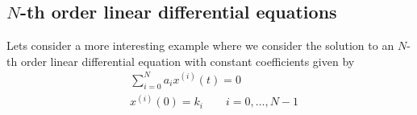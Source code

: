 \documentclass[a4paper,11pt]{exam}
\newcounter{ct}
\begin{document}
\begin{questions}
\subsection{$N$-th order linear differential equations}
Lets consider a more interesting example where we consider the solution to an $N$-th order linear differential equation with constant coefficients given by
\begin{align}
    &\sum_{i=0}^N a_i x^{(i)}(t) = 0\\
    &x^{(i)}(0) = k_i \qquad i = 0, \ldots, N-1
\end{align}



\end{questions}
\end{document}

